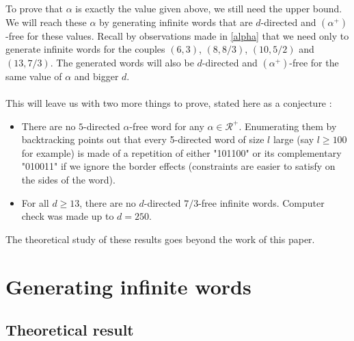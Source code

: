 \documentclass[a4paper]{article}
\theoremstyle{definition}
\begin{document}
To prove that $\alpha$ is exactly the value given above, we still need the upper bound. We will reach these $\alpha$ by generating infinite words that are $d$-directed and $(\alpha^+)$-free for these values. Recall by observations made in \ref{alpha} that we need only to generate infinite words for the couples $(6,3)$, $(8,8/3)$, $(10,5/2)$ and $(13,7/3)$. The generated words will also be $d$-directed and $(\alpha^+)$-free for the same value of $\alpha$ and bigger $d$.

\paragraph{}

This will leave us with two more things to prove, stated here as a conjecture :
\begin{itemize}
\item There are no $5$-directed $\alpha$-free word for any $\alpha \in \mathcal{R}^+$. Enumerating them by backtracking points out that every 5-directed word of size $l$ large (say $l \ge 100$ for example) is made of a repetition of either "101100" or its complementary "010011" if we ignore the border effects (constraints are easier to satisfy on the sides of the word).
\item For all $d \ge 13$, there are no $d$-directed $7/3$-free infinite words. Computer check was made up to $d = 250$.
\end{itemize}

The theoretical study of these results goes beyond the work of this paper.

	
	
\section{Generating infinite words}
\label{morphism}

\subsection{Theoretical result}	
	
	
\end{document}
